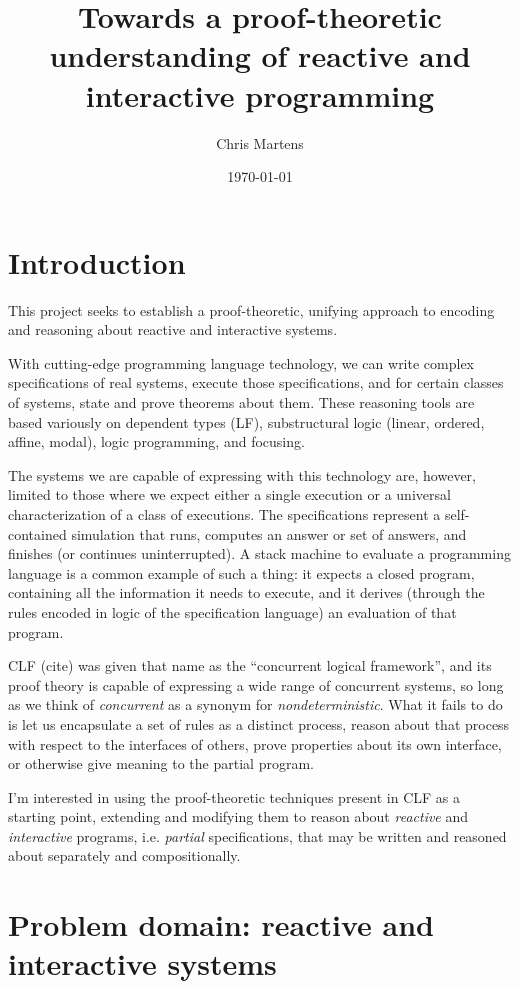 \documentclass{article}
\title{Towards a proof-theoretic understanding of reactive and interactive
programming}
\author{Chris Martens}
\date{\today}
\begin{document}
\maketitle

\section{Introduction}

This project seeks to establish a proof-theoretic, unifying approach to
encoding and reasoning about reactive and interactive systems.

With cutting-edge programming language technology, we can write complex
specifications of real systems, execute those specifications, and for
certain classes of systems, state and prove theorems about them. These
reasoning tools are based variously on dependent types (LF), substructural
logic (linear, ordered, affine, modal), logic programming,
and focusing.

The systems we are capable of expressing with this technology are, however,
limited to those where we expect either a single execution or a universal
characterization of a class of executions. The specifications represent a
self-contained simulation that runs, computes an answer or set of answers,
and finishes (or continues uninterrupted). A stack machine to evaluate
a programming language is a common example of such a thing: it expects a
closed program, containing all the information it needs to execute, and it
derives (through the rules encoded in logic of the specification language)
an evaluation of that program.

CLF (cite) was given that name as the ``concurrent logical framework'', and
its proof theory is capable of expressing a wide range of concurrent
systems, so long as we think of {\em concurrent} as a synonym for {\em
nondeterministic}. What it fails to do is let us encapsulate a set of rules
as a distinct process, reason about that process with respect to the
interfaces of others, prove properties about its own interface, or
otherwise give meaning to the partial program.

I'm interested in using the proof-theoretic techniques present in CLF as a
starting point, extending and modifying them to reason about {\em reactive}
and {\em interactive} programs, i.e. {\em partial} specifications, that may
be written and reasoned about separately and compositionally.


\section{Problem domain: reactive and interactive systems}
\end{document}
